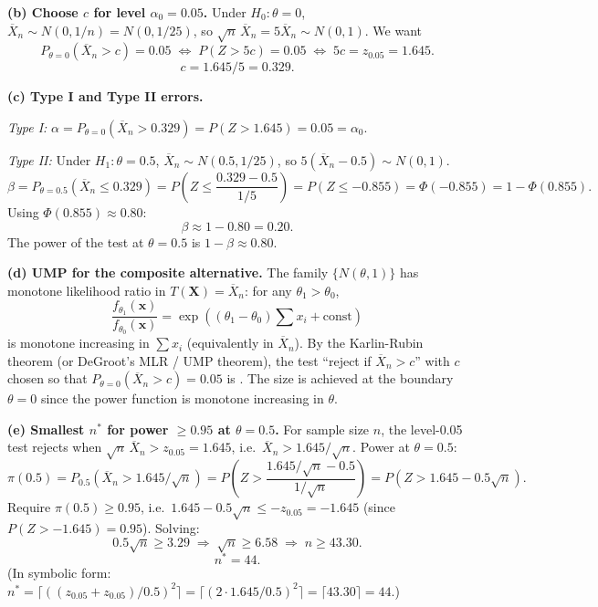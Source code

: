 \documentclass[11pt]{article}
\begin{document}
\textbf{(b) Choose $c$ for level $\alpha_0 = 0.05$.} Under $H_0: \theta = 0$, $\overline{X}_n \sim N(0, 1/n) = N(0, 1/25)$, so $\sqrt{n}\,\overline{X}_n = 5\overline{X}_n \sim N(0,1)$. We want
\[ P_{\theta=0}(\overline{X}_n > c) = 0.05 \;\Longleftrightarrow\; P(Z > 5c) = 0.05 \;\Longleftrightarrow\; 5c = z_{0.05} = 1.645. \]
\[ \boxed{c = 1.645/5 = 0.329.} \]

\textbf{(c) Type I and Type II errors.}

\emph{Type I:} $\alpha = P_{\theta=0}(\overline{X}_n > 0.329) = P(Z > 1.645) = 0.05 = \alpha_0$. \checkmark

\emph{Type II:} Under $H_1: \theta = 0.5$, $\overline{X}_n \sim N(0.5, 1/25)$, so $5(\overline{X}_n - 0.5) \sim N(0,1)$.
\[ \beta = P_{\theta=0.5}(\overline{X}_n \le 0.329) = P\!\left(Z \le \frac{0.329 - 0.5}{1/5}\right) = P(Z \le -0.855) = \Phi(-0.855) = 1 - \Phi(0.855). \]
Using $\Phi(0.855) \approx 0.80$:
\[ \boxed{\beta \approx 1 - 0.80 = 0.20.} \]
The power of the test at $\theta = 0.5$ is $1 - \beta \approx 0.80$.

\textbf{(d) UMP for the composite alternative.} The family $\{N(\theta,1)\}$ has monotone likelihood ratio in $T(\mathbf{X}) = \overline{X}_n$: for any $\theta_1 > \theta_0$,
\[ \frac{f_{\theta_1}(\mathbf{x})}{f_{\theta_0}(\mathbf{x})} = \exp\!\left((\theta_1 - \theta_0)\sum x_i + \text{const}\right) \]
is monotone increasing in $\sum x_i$ (equivalently in $\overline{X}_n$). By the Karlin-Rubin theorem (or DeGroot's MLR / UMP theorem), the test ``reject if $\overline{X}_n > c$'' with $c$ chosen so that $P_{\theta=0}(\overline{X}_n > c) = 0.05$ is . The size is achieved at the boundary $\theta = 0$ since the power function is monotone increasing in $\theta$.

\textbf{(e) Smallest $n^*$ for power $\ge 0.95$ at $\theta = 0.5$.} For sample size $n$, the level-0.05 test rejects when $\sqrt{n}\,\overline{X}_n > z_{0.05} = 1.645$, i.e.\ $\overline{X}_n > 1.645/\sqrt{n}$. Power at $\theta = 0.5$:
\[ \pi(0.5) = P_{0.5}\!\left(\overline{X}_n > 1.645/\sqrt{n}\right) = P\!\left(Z > \frac{1.645/\sqrt{n} - 0.5}{1/\sqrt{n}}\right) = P\!\left(Z > 1.645 - 0.5\sqrt{n}\right). \]
Require $\pi(0.5) \ge 0.95$, i.e.\ $1.645 - 0.5\sqrt{n} \le -z_{0.05} = -1.645$ (since $P(Z > -1.645) = 0.95$). Solving:
\[ 0.5\sqrt{n} \ge 3.29 \;\Longrightarrow\; \sqrt{n} \ge 6.58 \;\Longrightarrow\; n \ge 43.30. \]
\[ \boxed{n^* = 44.} \]
(In symbolic form: $n^* = \lceil ((z_{0.05} + z_{0.05})/0.5)^2 \rceil = \lceil (2 \cdot 1.645 / 0.5)^2 \rceil = \lceil 43.30 \rceil = 44$.)
\end{document}
